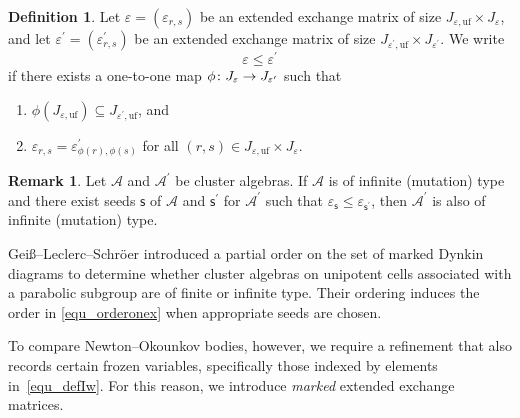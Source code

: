 \documentclass[11pt]{amsart}
\def\mcal{\mathcal}
\numberwithin{equation}{section}
\theoremstyle{plain}
\theoremstyle{definition}
\newtheorem{definition}[theorem]{Definition}
\newtheorem{remark}[theorem]{Remark}
\def\to{\mathchoice{\longrightarrow}{\rightarrow}{\rightarrow}{\rightarrow}}
\numberwithin{equation}{section}
\newcommand{\seed}{\mathsf{s}}
\begin{document}
\begin{definition}\label{def_parorderonskewsy}
Let $\varepsilon = (\varepsilon_{r,s})$ be an extended exchange matrix of size $J_{\varepsilon, \mathrm{uf}} \times J_{\varepsilon}$, and let $\varepsilon^\prime = (\varepsilon^\prime_{r,s})$ be an extended exchange matrix of size $J_{\varepsilon^\prime, \mathrm{uf}} \times J_{\varepsilon^\prime}$. We write 
\begin{equation}\label{equ_orderonex}
\varepsilon \leq \varepsilon^\prime
\end{equation}
if there exists a one-to-one map $\phi \colon J_{\varepsilon} \to J_{\varepsilon^\prime}$ such that 
\begin{enumerate}
\item $\phi ({J_{\varepsilon,\mathrm{uf}}}) \subseteq J_{\varepsilon^\prime,\mathrm{uf}}$, and 
\item $\varepsilon_{r,s} = \varepsilon^\prime_{\phi(r), \phi(s)}$ for all $(r,s) \in J_{\varepsilon, \mathrm{uf}} \times J_{\varepsilon}$.
\end{enumerate}
\end{definition}

\begin{remark}
Let $\mcal{A}$ and $\mcal{A}^\prime$ be cluster algebras. If $\mcal{A}$ is of infinite (mutation) type and there exist seeds $\seed$ of $\mcal{A}$ and $\seed^\prime$ for $\mcal{A}^\prime$ such that $\varepsilon_\seed \leq \varepsilon_{\seed^\prime}$, then $\mcal{A}^\prime$ is also of infinite (mutation) type.
\end{remark}

Gei{\ss}--Leclerc--Schr{\"{o}}er \cite{GLS08} introduced a partial order on the set of marked Dynkin diagrams to determine whether cluster algebras on unipotent cells associated with a parabolic subgroup are of finite or infinite type. Their ordering induces the order in \eqref{equ_orderonex} when appropriate seeds are chosen. 

To compare Newton–Okounkov bodies, however, we require a refinement that also records certain frozen variables, specifically those indexed by elements in~\eqref{equ_defIw}. For this reason, we introduce \emph{marked} extended exchange matrices.
\end{document}
